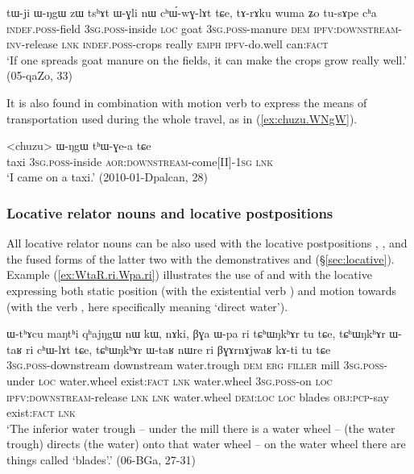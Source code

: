 \begin{exe}
\ex \label{ex:tWji.WNgW.chWwGlAt}
\gll tɯ-ji ɯ-ŋgɯ zɯ tsʰɤt ɯ-ɣli nɯ cʰɯ́-wɣ-lɤt tɕe, tɤ-rɤku wuma ʑo tu-sɤpe cʰa \\
\textsc{indef}.\textsc{poss}-field  \textsc{3sg}.\textsc{poss}-inside \textsc{loc} goat \textsc{3sg}.\textsc{poss}-manure \textsc{dem} \textsc{ipfv}:\textsc{downstream}-\textsc{inv}-release \textsc{lnk} \textsc{indef}.\textsc{poss}-crops really \textsc{emph} \textsc{ipfv}-do.well can:\textsc{fact} \\
\glt `If one spreads goat manure on the fields, it can make the crops grow really well.' (05-qaZo, 33)
\end{exe} 

It is also found in combination with motion verb to express the means of transportation used during the whole travel, as in (\ref{ex:chuzu.WNgW}).

\begin{exe}
\ex \label{ex:chuzu.WNgW}
\gll  <chuzu> ɯ-ŋgɯ tʰɯ-ɣe-a tɕe \\
taxi \textsc{3sg}.\textsc{poss}-inside \textsc{aor}:\textsc{downstream}-come[II]-\textsc{1sg} \textsc{lnk} \\
\glt `I came on a taxi.' (2010-01-Dpalcan, 28)
\end{exe} 



\subsubsection{Locative relator nouns and locative postpositions} \label{sec:relator.postposition.location}
 All locative relator nouns can be also used with the locative postpositions , ,  and the fused forms of the latter two with the demonstratives  and  (§\ref{sec:locative}). Example (\ref{ex:WtaR.ri.Wpa.ri}) illustrates the use of  and  with the locative  expressing both static position (with the existential verb ) and motion towards (with the verb , here specifically meaning `direct water').

\begin{exe}
\ex \label{ex:WtaR.ri.Wpa.ri}
\gll ɯ-tʰɤcu maŋtʰi qʰajŋgɯ nɯ kɯ, nɤki, βɣa ɯ-pa ri tɕʰɯŋkʰɤr tu tɕe, tɕʰɯŋkʰɤr ɯ-taʁ ri cʰɯ-lɤt tɕe, tɕʰɯŋkʰɤr ɯ-taʁ nɯre ri βɣɤrnɤjwaʁ kɤ-ti tu tɕe \\
\textsc{3sg}.\textsc{poss}-downstream downstream water.trough \textsc{dem} \textsc{erg} \textsc{filler} mill \textsc{3sg}.\textsc{poss}-under \textsc{loc} water.wheel exist:\textsc{fact} \textsc{lnk} water.wheel \textsc{3sg}.\textsc{poss}-on \textsc{loc} \textsc{ipfv}:\textsc{downstream}-release \textsc{lnk} \textsc{lnk} water.wheel \textsc{dem}:\textsc{loc} \textsc{loc} blades \textsc{obj}:\textsc{pcp}-say exist:\textsc{fact} \textsc{lnk} \\
\glt `The inferior water trough -- under the mill there is a water wheel -- (the water trough) directs (the water) onto that water wheel -- on the water wheel there are things called `blades'.' (06-BGa, 27-31)
\end{exe}

